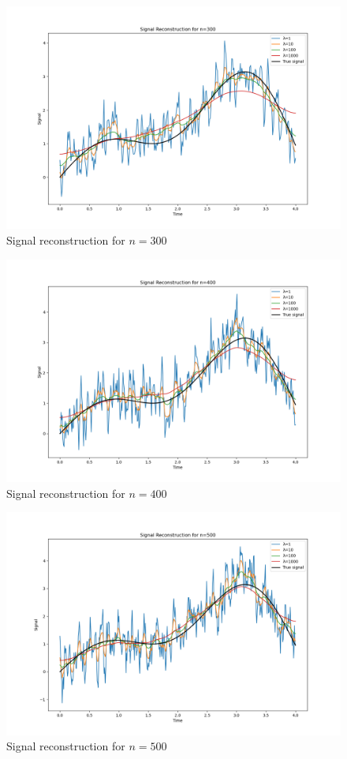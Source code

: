\documentclass{article}
\begin{document}
\begin{figure}[h!]
\centering
\includegraphics[width=\textwidth]{signalplot_300.png}
\caption{Signal reconstruction for $n = 300$}
\end{figure}

\begin{figure}[h!]
\centering
\includegraphics[width=\textwidth]{signalplot_400.png}
\caption{Signal reconstruction for $n = 400$}
\end{figure}

\begin{figure}[h!]
\centering
\includegraphics[width=\textwidth]{signalplot_500.png}
\caption{Signal reconstruction for $n = 500$}
\end{figure}
\end{document}

